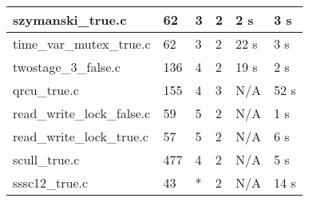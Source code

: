\begin{table}[h]
\begin{tabular}{|l|l|l|l|l|l|}
\hline
szymanski\_true.c          & 62  & 3       & 2            & 2 s             & 3 s            \\
\hline
time\_var\_mutex\_true.c   & 62  & 3       & 2            & 22 s            & 3 s            \\
\hline
twostage\_3\_false.c       & 136 & 4       & 2            & 19 s            & 2 s            \\
\hline
qrcu\_true.c               & 155 & 4       & 3            & N/A             & 52 s           \\
\hline
read\_write\_lock\_false.c & 59  & 5       & 2            & N/A             & 1 s            \\
\hline
read\_write\_lock\_true.c  & 57  & 5       & 2            & N/A             & 6 s            \\
\hline
scull\_true.c              & 477 & 4       & 2            & N/A             & 5 s            \\
\hline
sssc12\_true.c             & 43  & *       & 2            & N/A             & 14 s           \\
\hline
\end{tabular}
\end{table}


